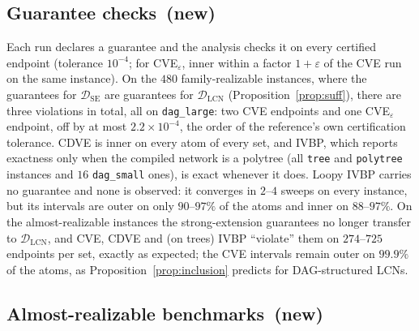 \documentclass{article} %
\DeclareRobustCommand{\rev}[1]{{\color{blue}#1}}
\newcommand{\newtag}{\texorpdfstring{~\rev{(new)}}{}}
\newcommand{\DSE}{\mathcal{D}_{\mathrm{SE}}}
\newcommand{\DLCN}{\mathcal{D}_{\mathrm{LCN}}}
\begin{document}
\subsection{Guarantee checks\newtag}
\label{sec-guarantees}

Each run declares a guarantee and the analysis checks it on every certified endpoint (tolerance $10^{-4}$; for CVE$_\varepsilon$, inner within a factor $1+\varepsilon$ of the CVE run on the same instance). On the $480$ family-realizable instances, where the guarantees for $\DSE$ are guarantees for $\DLCN$ (Proposition~\ref{prop:suff}), there are three violations in total, all on \texttt{dag\_large}: two CVE endpoints and one CVE$_\varepsilon$ endpoint, off by at most $2.2\times 10^{-4}$, the order of the reference's own certification tolerance. CDVE is inner on every atom of every set, and IVBP, which reports exactness only when the compiled network is a polytree (all \texttt{tree} and \texttt{polytree} instances and $16$ \texttt{dag\_small} ones), is exact whenever it does. Loopy IVBP carries no guarantee and none is observed: it converges in $2$--$4$ sweeps on every instance, but its intervals are outer on only $90$--$97\%$ of the atoms and inner on $88$--$97\%$. On the almost-realizable instances the strong-extension guarantees no longer transfer to $\DLCN$, and CVE, CDVE and (on trees) IVBP ``violate'' them on $274$--$725$ endpoints per set, exactly as expected; the CVE intervals remain outer on $99.9\%$ of the atoms, as Proposition~\ref{prop:inclusion} predicts for DAG-structured LCNs.

\subsection{Almost-realizable benchmarks\newtag}
\label{sec-nr-bench}
\end{document}
